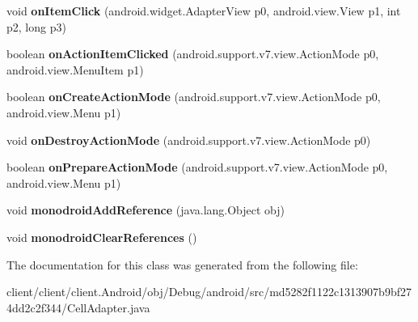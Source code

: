 \begin{DoxyCompactItemize}
\item 
\hypertarget{classmd5282f1122c1313907b9bf274dd2c2f344_1_1CellAdapter_a4ac1e1af54a3a6ae73af63636c274421}{}void {\bfseries on\+Item\+Click} (android.\+widget.\+Adapter\+View p0, android.\+view.\+View p1, int p2, long p3)\label{classmd5282f1122c1313907b9bf274dd2c2f344_1_1CellAdapter_a4ac1e1af54a3a6ae73af63636c274421}

\item 
\hypertarget{classmd5282f1122c1313907b9bf274dd2c2f344_1_1CellAdapter_ae49beec87fd5c3f85c6371948d94b1f4}{}boolean {\bfseries on\+Action\+Item\+Clicked} (android.\+support.\+v7.\+view.\+Action\+Mode p0, android.\+view.\+Menu\+Item p1)\label{classmd5282f1122c1313907b9bf274dd2c2f344_1_1CellAdapter_ae49beec87fd5c3f85c6371948d94b1f4}

\item 
\hypertarget{classmd5282f1122c1313907b9bf274dd2c2f344_1_1CellAdapter_aa6076cab60bcebac631f4f95c7d920d1}{}boolean {\bfseries on\+Create\+Action\+Mode} (android.\+support.\+v7.\+view.\+Action\+Mode p0, android.\+view.\+Menu p1)\label{classmd5282f1122c1313907b9bf274dd2c2f344_1_1CellAdapter_aa6076cab60bcebac631f4f95c7d920d1}

\item 
\hypertarget{classmd5282f1122c1313907b9bf274dd2c2f344_1_1CellAdapter_a38ad861cc58bcca0b099879b3cc3b37d}{}void {\bfseries on\+Destroy\+Action\+Mode} (android.\+support.\+v7.\+view.\+Action\+Mode p0)\label{classmd5282f1122c1313907b9bf274dd2c2f344_1_1CellAdapter_a38ad861cc58bcca0b099879b3cc3b37d}

\item 
\hypertarget{classmd5282f1122c1313907b9bf274dd2c2f344_1_1CellAdapter_a2ca12402dc68b8b9ea84602a69cc923b}{}boolean {\bfseries on\+Prepare\+Action\+Mode} (android.\+support.\+v7.\+view.\+Action\+Mode p0, android.\+view.\+Menu p1)\label{classmd5282f1122c1313907b9bf274dd2c2f344_1_1CellAdapter_a2ca12402dc68b8b9ea84602a69cc923b}

\item 
\hypertarget{classmd5282f1122c1313907b9bf274dd2c2f344_1_1CellAdapter_a3f9eaa56d2c8eedb20ea67b9c0be725c}{}void {\bfseries monodroid\+Add\+Reference} (java.\+lang.\+Object obj)\label{classmd5282f1122c1313907b9bf274dd2c2f344_1_1CellAdapter_a3f9eaa56d2c8eedb20ea67b9c0be725c}

\item 
\hypertarget{classmd5282f1122c1313907b9bf274dd2c2f344_1_1CellAdapter_aa20337eae9a33eb562d78d1e1548dd22}{}void {\bfseries monodroid\+Clear\+References} ()\label{classmd5282f1122c1313907b9bf274dd2c2f344_1_1CellAdapter_aa20337eae9a33eb562d78d1e1548dd22}

\end{DoxyCompactItemize}


The documentation for this class was generated from the following file\+:\begin{DoxyCompactItemize}
\item 
client/client/client.\+Android/obj/\+Debug/android/src/md5282f1122c1313907b9bf274dd2c2f344/Cell\+Adapter.\+java\end{DoxyCompactItemize}
